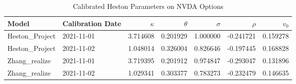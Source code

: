 \begin{table}[htbp]
  \centering
  \caption{Calibrated Heston Parameters on NVDA Options}
  \label{tab:nvda_parameters}
  \begin{tabular}{llrrrrr}
    \toprule
    \textbf{Model} & \textbf{Calibration Date} & $\kappa$ & $\theta$ & $\sigma$ & $\rho$ & $v_0$ \\
    \midrule
    Heston\_Project & 2021-11-01 & 3.714608 & 0.201929 & 1.000000 & -0.241721 & 0.159278 \\
    Heston\_Project & 2021-11-02 & 1.048014 & 0.326004 & 0.826646 & -0.197445 & 0.168828 \\
    Zhang\_realize & 2021-11-01 & 3.719395 & 0.201912 & 0.974847 & -0.293047 & 0.131896 \\
    Zhang\_realize & 2021-11-02 & 1.029341 & 0.303377 & 0.783273 & -0.232479 & 0.146635 \\
    \bottomrule
  \end{tabular}
\end{table}
